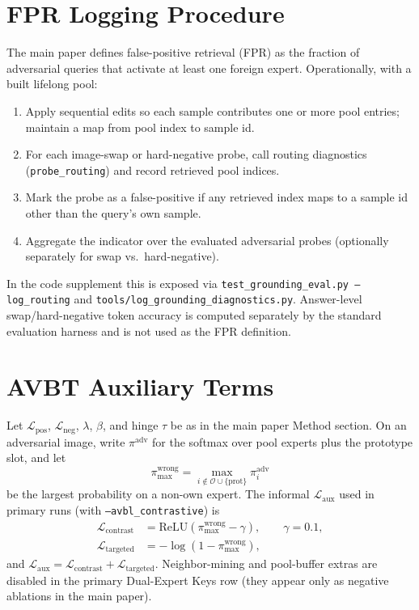 \documentclass[letterpaper]{article}
\begin{document}
\section{FPR Logging Procedure}
The main paper defines false-positive retrieval (FPR) as the fraction of adversarial queries that activate at least one foreign expert.
Operationally, with a built lifelong pool:

\begin{enumerate}
\item Apply sequential edits so each sample contributes one or more pool entries; maintain a map from pool index to sample id.
\item For each image-swap or hard-negative probe, call routing diagnostics (\texttt{probe\_routing}) and record retrieved pool indices.
\item Mark the probe as a false-positive if any retrieved index maps to a sample id other than the query's own sample.
\item Aggregate the indicator over the evaluated adversarial probes (optionally separately for swap vs.\ hard-negative).
\end{enumerate}

In the code supplement this is exposed via \texttt{test\_grounding\_eval.py --log\_routing} and \texttt{tools/log\_grounding\_diagnostics.py}.
Answer-level swap/hard-negative token accuracy is computed separately by the standard evaluation harness and is not used as the FPR definition.

\section{AVBT Auxiliary Terms}
Let $\mathcal{L}_{\mathrm{pos}}$, $\mathcal{L}_{\mathrm{neg}}$, $\lambda$, $\beta$, and hinge $\tau$ be as in the main paper Method section.
On an adversarial image, write $\pi^{\mathrm{adv}}$ for the softmax over pool experts plus the prototype slot, and let
\[
\pi^{\mathrm{wrong}}_{\max}
=
\max_{i\notin\mathcal{O}\cup\{\mathrm{prot}\}}\pi^{\mathrm{adv}}_i
\]
be the largest probability on a non-own expert.
The informal $\mathcal{L}_{\mathrm{aux}}$ used in primary runs (with \texttt{--avbl\_contrastive}) is
\begin{align}
\mathcal{L}_{\mathrm{contrast}}
&=
\mathrm{ReLU}\!\left(\pi^{\mathrm{wrong}}_{\max}-\gamma\right),
\qquad \gamma{=}0.1,
\\
\mathcal{L}_{\mathrm{targeted}}
&=
-\log\!\left(1-\pi^{\mathrm{wrong}}_{\max}\right),
\end{align}
and $\mathcal{L}_{\mathrm{aux}}=\mathcal{L}_{\mathrm{contrast}}+\mathcal{L}_{\mathrm{targeted}}$.
Neighbor-mining and pool-buffer extras are disabled in the primary Dual-Expert Keys row (they appear only as negative ablations in the main paper).
\end{document}
